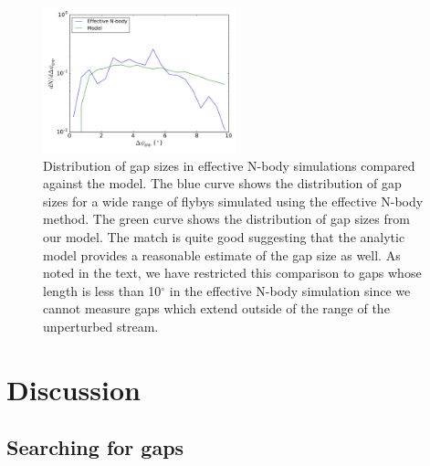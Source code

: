\documentclass[useAMS,usenatbib]{mn2e}
\begin{document}
\begin{figure}
\centering
\includegraphics[width=0.5\textwidth]{dndpsi.pdf}
\caption{Distribution of gap sizes in effective N-body simulations compared against the model. The blue curve shows the distribution of gap sizes for a wide range of flybys simulated using the effective N-body method. The green curve shows the distribution of gap sizes from our model. The match is quite good suggesting that the analytic model provides a reasonable estimate of the gap size as well. As noted in the text, we have restricted this comparison to gaps whose length is less than 10$^\circ$ in the effective N-body simulation since we cannot measure gaps which extend outside of the range of the unperturbed stream.  } 
\label{fig:dndpsi}
\end{figure}  

\section{Discussion} \label{sec:discussion}



\subsection{Searching for gaps}
\end{document}
